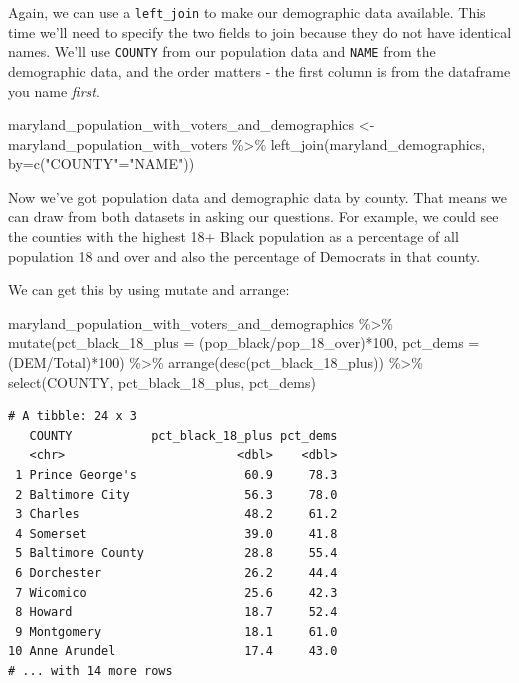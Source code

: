 \documentclass[
  letterpaper,
  DIV=11,
  numbers=noendperiod]{scrreprt}
\newenvironment{Shaded}{\begin{snugshade}}{\end{snugshade}}
\newcommand{\AttributeTok}[1]{\textcolor[rgb]{0.40,0.45,0.13}{#1}}
\newcommand{\DecValTok}[1]{\textcolor[rgb]{0.68,0.00,0.00}{#1}}
\newcommand{\FunctionTok}[1]{\textcolor[rgb]{0.28,0.35,0.67}{#1}}
\newcommand{\NormalTok}[1]{\textcolor[rgb]{0.00,0.23,0.31}{#1}}
\newcommand{\OtherTok}[1]{\textcolor[rgb]{0.00,0.23,0.31}{#1}}
\newcommand{\SpecialCharTok}[1]{\textcolor[rgb]{0.37,0.37,0.37}{#1}}
\newcommand{\StringTok}[1]{\textcolor[rgb]{0.13,0.47,0.30}{#1}}
\begin{document}
Again, we can use a \texttt{left\_join} to make our demographic data
available. This time we'll need to specify the two fields to join
because they do not have identical names. We'll use \texttt{COUNTY} from
our population data and \texttt{NAME} from the demographic data, and the
order matters - the first column is from the dataframe you name
\emph{first}.

\begin{Shaded}
\begin{Highlighting}[]
\NormalTok{maryland\_population\_with\_voters\_and\_demographics }\OtherTok{\textless{}{-}}\NormalTok{ maryland\_population\_with\_voters }\SpecialCharTok{\%\textgreater{}\%} \FunctionTok{left\_join}\NormalTok{(maryland\_demographics, }\AttributeTok{by=}\FunctionTok{c}\NormalTok{(}\StringTok{"COUNTY"}\OtherTok{=}\StringTok{"NAME"}\NormalTok{))}
\end{Highlighting}
\end{Shaded}

Now we've got population data and demographic data by county. That means
we can draw from both datasets in asking our questions. For example, we
could see the counties with the highest 18+ Black population as a
percentage of all population 18 and over and also the percentage of
Democrats in that county.

We can get this by using mutate and arrange:

\begin{Shaded}
\begin{Highlighting}[]
\NormalTok{maryland\_population\_with\_voters\_and\_demographics }\SpecialCharTok{\%\textgreater{}\%}
  \FunctionTok{mutate}\NormalTok{(}\AttributeTok{pct\_black\_18\_plus =}\NormalTok{ (pop\_black}\SpecialCharTok{/}\NormalTok{pop\_18\_over)}\SpecialCharTok{*}\DecValTok{100}\NormalTok{, }\AttributeTok{pct\_dems =}\NormalTok{ (DEM}\SpecialCharTok{/}\NormalTok{Total)}\SpecialCharTok{*}\DecValTok{100}\NormalTok{) }\SpecialCharTok{\%\textgreater{}\%}
  \FunctionTok{arrange}\NormalTok{(}\FunctionTok{desc}\NormalTok{(pct\_black\_18\_plus)) }\SpecialCharTok{\%\textgreater{}\%}
  \FunctionTok{select}\NormalTok{(COUNTY, pct\_black\_18\_plus, pct\_dems)}
\end{Highlighting}
\end{Shaded}

\begin{verbatim}
# A tibble: 24 x 3
   COUNTY           pct_black_18_plus pct_dems
   <chr>                        <dbl>    <dbl>
 1 Prince George's               60.9     78.3
 2 Baltimore City                56.3     78.0
 3 Charles                       48.2     61.2
 4 Somerset                      39.0     41.8
 5 Baltimore County              28.8     55.4
 6 Dorchester                    26.2     44.4
 7 Wicomico                      25.6     42.3
 8 Howard                        18.7     52.4
 9 Montgomery                    18.1     61.0
10 Anne Arundel                  17.4     43.0
# ... with 14 more rows
\end{verbatim}
\end{document}
